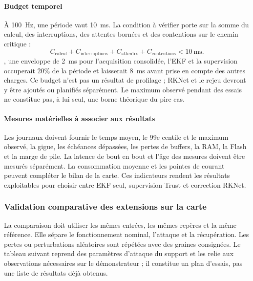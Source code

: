\paragraph{Budget temporel}
À 100~Hz, une période vaut 10~ms. La condition à vérifier porte sur la somme du calcul, des interruptions, des attentes bornées et des contentions sur le chemin critique :
\begin{equation}
C_{\mathrm{calcul}}+C_{\mathrm{interruptions}}+
C_{\mathrm{attentes}}+C_{\mathrm{contentions}}<10~\mathrm{ms}.
\end{equation}
, une enveloppe de 2~ms pour l'acquisition consolidée, l'EKF et la supervision occuperait 20\% de la période et laisserait 8~ms avant prise en compte des autres charges. Ce budget n'est pas un résultat de profilage ; RKNet et le rejeu devront y être ajoutés ou planifiés séparément. Le maximum observé pendant des essais ne constitue pas, à lui seul, une borne théorique du pire cas.

\paragraph{Mesures matérielles à associer aux résultats}
Les journaux doivent fournir le temps moyen, le 99e centile et le maximum observé, la gigue, les échéances dépassées, les pertes de buffers, la RAM, la Flash et la marge de pile. La latence de bout en bout et l'âge des mesures doivent être mesurés séparément. La consommation moyenne et les pointes de courant peuvent compléter le bilan de la carte. Ces indicateurs rendent les résultats exploitables pour choisir entre EKF seul, supervision Trust et correction RKNet.
\FloatBarrier

\subsubsection{Validation comparative des extensions sur la carte}

La comparaison doit utiliser les mêmes entrées, les mêmes repères et la même référence. Elle sépare le fonctionnement nominal, l'attaque et la récupération. Les pertes ou perturbations aléatoires sont répétées avec des graines consignées. Le tableau suivant reprend des paramètres d'attaque du support et les relie aux observations nécessaires sur le démonstrateur ; il constitue un plan d'essais, pas une liste de résultats déjà obtenus.

